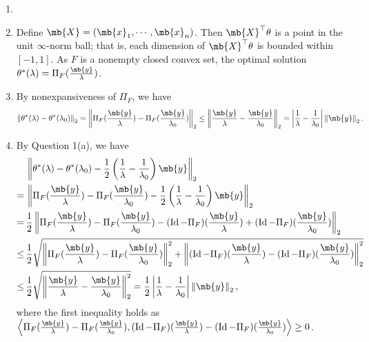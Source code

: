 \begin{exercise}
\begin{enumerate}
      \begin{solution}
        \begin{enumerate}
          \item []
          \item Define $\mb{X} = (\mb{x}_1, \cdots, \mb{x}_n)$. Then $\mb{X}^\top\theta$ is a point in the unit $\infty$-norm ball; that is, each dimension of $\mb{X}^\top\theta$ is bounded within $[-1,1]$. As $F$ is a nonempty closed convex set, the optimal solution $\theta^*(\lambda) = \Pi_F(\frac{\mb{y}}{\lambda})$.
          \item By nonexpansiveness of $\Pi_F$, we have $$\left\|\theta^*(\lambda) - \theta^*(\lambda_0)\right\|_2 = \left\|\Pi_F(\frac{\mb{y}}{\lambda}) - \Pi_F(\frac{\mb{y}}{\lambda_0})\right\|_2 \le \left\|\frac{\mb{y}}{\lambda} - \frac{\mb{y}}{\lambda_0}\right\|_2 = \left|\frac{1}{\lambda} - \frac{1}{\lambda_0}\right| \left\|\mb{y}\right\|_2.$$
          \item By Question 1(a), we have
            \begin{align*}
                    & \left\|\theta^*(\lambda) - \theta^*(\lambda_0) - \frac{1}{2} \left(\frac{1}{\lambda} - \frac{1}{\lambda_0}\right)\mb{y}\right\|_2                                                                     \\
              = \,  & \left\|\Pi_F(\frac{\mb{y}}{\lambda}) - \Pi_F(\frac{\mb{y}}{\lambda_0}) - \frac{1}{2} \left(\frac{1}{\lambda} - \frac{1}{\lambda_0}\right)\mb{y}\right\|_2                                             \\
              =\,   & \frac{1}{2}\left\|\Pi_F(\frac{\mb{y}}{\lambda}) - \Pi_F(\frac{\mb{y}}{\lambda_0}) - (\Id-\Pi_F)(\frac{\mb{y}}{\lambda}) + (\Id-\Pi_F)(\frac{\mb{y}}{\lambda_0})\right\|_2                             \\
              \le\, & \frac{1}{2}\sqrt{\left\|\Pi_F(\frac{\mb{y}}{\lambda}) - \Pi_F(\frac{\mb{y}}{\lambda_0})\right\|_2^2 + \left\|(\Id-\Pi_F)(\frac{\mb{y}}{\lambda}) - (\Id-\Pi_F)(\frac{\mb{y}}{\lambda_0})\right\|^2_2} \\
              \le\, & \frac{1}{2}\sqrt{\left\|\frac{\mb{y}}{\lambda} - \frac{\mb{y}}{\lambda_0}\right\|^2_2} = \frac{1}{2}\left|\frac{1}{\lambda} - \frac{1}{\lambda_0}\right|\left\|\mb{y}\right\|_2,
            \end{align*}
            where the first inequality holds as $\left\langle\Pi_F(\frac{\mb{y}}{\lambda}) - \Pi_F(\frac{\mb{y}}{\lambda_0}), (\Id-\Pi_F)(\frac{\mb{y}}{\lambda}) - (\Id-\Pi_F)(\frac{\mb{y}}{\lambda_0}) \right\rangle \ge 0 $.

\end{enumerate}
\end{solution}
\end{enumerate}
\end{exercise}

